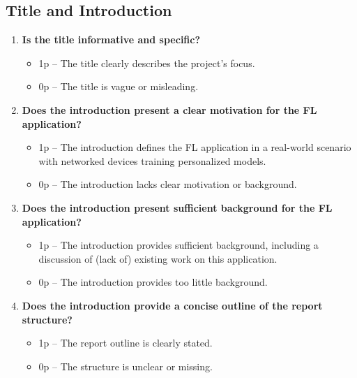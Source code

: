\documentclass{article}
\begin{document}
	\subsection{Title and Introduction}
	\begin{enumerate}
		\item \textbf{Is the title informative and specific?}  
		\begin{itemize}
			\item 1p – The title clearly describes the project’s focus.
			\item 0p – The title is vague or misleading.
		\end{itemize}
		
		\item \textbf{Does the introduction present a clear motivation for the FL application?}  
		\begin{itemize}
			\item 1p – The introduction defines the FL application in a real-world scenario with networked devices training personalized models.
			\item 0p – The introduction lacks clear motivation or background.
		\end{itemize}
		
		\item \textbf{Does the introduction present sufficient background for the FL application?}  
		\begin{itemize}
			\item 1p – The introduction provides sufficient background, including a discussion of (lack of) existing 
			work on this application. 
			\item 0p – The introduction provides too little background. 
		\end{itemize}
		
		\item \textbf{Does the introduction provide a concise outline of the report structure?}  
		\begin{itemize}
			\item 1p – The report outline is clearly stated.
			\item 0p – The structure is unclear or missing.
		\end{itemize}
	\end{enumerate}
	
\end{document}
